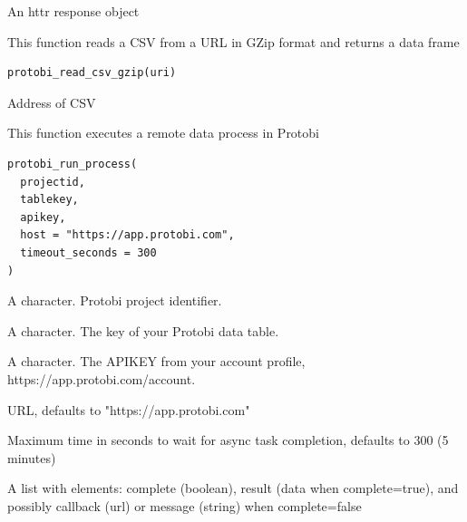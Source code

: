 \documentclass[a4paper]{book}
\begin{document}
%
\begin{Value}
An httr response object
\end{Value}
%
\begin{SeeAlso}
\end{SeeAlso}
%
\begin{Description}\relax
This function reads a CSV from a URL in GZip format and returns a data frame
\end{Description}
%
\begin{Usage}
\begin{verbatim}
protobi_read_csv_gzip(uri)
\end{verbatim}
\end{Usage}
%
\begin{Arguments}
\begin{ldescription}
\item[\code{uri}] Address of CSV
\end{ldescription}
\end{Arguments}
%
\begin{Description}\relax
This function executes a remote data process in Protobi
\end{Description}
%
\begin{Usage}
\begin{verbatim}
protobi_run_process(
  projectid,
  tablekey,
  apikey,
  host = "https://app.protobi.com",
  timeout_seconds = 300
)
\end{verbatim}
\end{Usage}
%
\begin{Arguments}
\begin{ldescription}
\item[\code{projectid}] A character. Protobi project identifier.

\item[\code{tablekey}] A character. The key of your Protobi data table.

\item[\code{apikey}] A character. The APIKEY from your account profile, https://app.protobi.com/account.

\item[\code{host}] URL, defaults to "https://app.protobi.com"

\item[\code{timeout\_seconds}] Maximum time in seconds to wait for async task completion, defaults to 300 (5 minutes)
\end{ldescription}
\end{Arguments}
%
\begin{Value}
A list with elements: complete (boolean), result (data when complete=true), and possibly callback (url) or message (string) when complete=false
\end{Value}
\printindex{}
\end{document}

